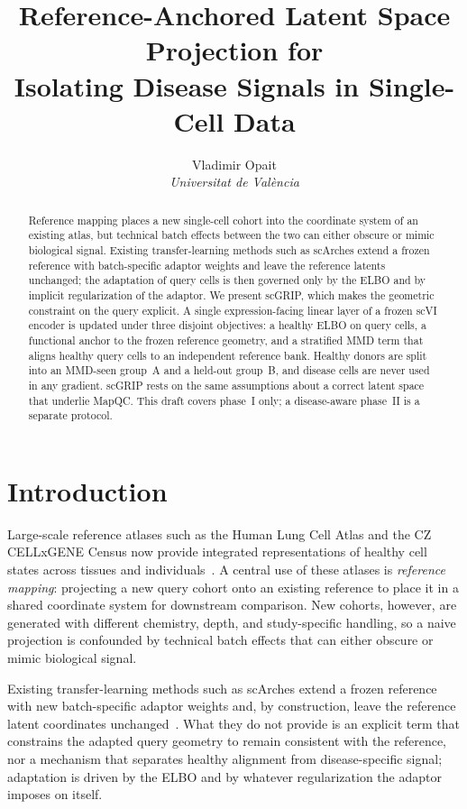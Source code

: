 \documentclass[12pt, a4paper]{article}
\title{Reference-Anchored Latent Space Projection for\\
Isolating Disease Signals in Single-Cell Data}
\author{Vladimir Opait \\
\small \textit{Universitat de Val\`encia}}
\date{}
\begin{document}
\maketitle

\begin{abstract}
Reference mapping places a new single-cell cohort into the coordinate
system of an existing atlas, but technical batch effects between the two
can either obscure or mimic biological signal. Existing transfer-learning
methods such as scArches extend a frozen reference with batch-specific
adaptor weights and leave the reference latents unchanged; the adaptation
of query cells is then governed only by the ELBO and by implicit
regularization of the adaptor. We present scGRIP, which makes the
geometric constraint on the query explicit. A single expression-facing
linear layer of a frozen scVI encoder is updated under three disjoint
objectives: a healthy ELBO on query cells, a functional anchor to the
frozen reference geometry, and a stratified MMD term that aligns healthy
query cells to an independent reference bank. Healthy donors are split
into an MMD-seen group~A and a held-out group~B, and disease cells are
never used in any gradient. scGRIP rests on the same assumptions about a
correct latent space that underlie MapQC. This draft covers phase~I only;
a disease-aware phase~II is a separate protocol.
\end{abstract}


\section{Introduction}
\label{sec:intro}

Large-scale reference atlases such as the Human Lung Cell Atlas and the
CZ CELLxGENE Census now provide integrated representations of healthy
cell states across tissues and individuals~\cite{cellxgene_census_2023}.
A central use of these atlases is \emph{reference mapping}: projecting a
new query cohort onto an existing reference to place it in a shared
coordinate system for downstream comparison. New cohorts, however, are
generated with different chemistry, depth, and study-specific handling,
so a naive projection is confounded by technical batch effects that can
either obscure or mimic biological signal.

Existing transfer-learning methods such as scArches extend a frozen
reference with new batch-specific adaptor weights and, by construction,
leave the reference latent coordinates
unchanged~\cite{scarches_2022}. What they do not provide is an explicit
term that constrains the adapted query geometry to remain consistent
with the reference, nor a mechanism that separates healthy alignment
from disease-specific signal; adaptation is driven by the ELBO and by
whatever regularization the adaptor imposes on itself.
\end{document}
